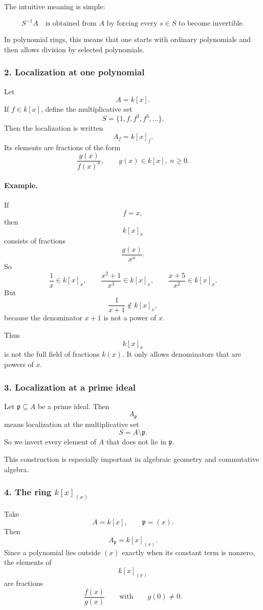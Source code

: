 \documentclass[12pt,a4paper]{article}
\theoremstyle{notespace}
\theoremstyle{definition}
\begin{document}
The intuitive meaning is simple:

\[
S^{-1}A
\quad\text{is obtained from }A\text{ by forcing every }s\in S\text{ to become invertible.}
\]

In polynomial rings, this means that one starts with ordinary polynomials and then allows division by selected polynomials.

\subsubsection{2. Localization at one polynomial}

Let
\[
A=k[x].
\]
If \(f\in k[x]\), define the multiplicative set
\[
S=\{1,f,f^2,f^3,\dots\}.
\]
Then the localization is written
\[
A_f=k[x]_f.
\]
Its elements are fractions of the form
\[
\frac{g(x)}{f(x)^n},
\qquad
g(x)\in k[x],\ n\ge 0.
\]

\paragraph{Example.}
If
\[
f=x,
\]
then
\[
k[x]_x
\]
consists of fractions
\[
\frac{g(x)}{x^n}.
\]
So
\[
\frac{1}{x}\in k[x]_x,
\qquad
\frac{x^2+1}{x^3}\in k[x]_x,
\qquad
\frac{x+5}{x^2}\in k[x]_x.
\]
But
\[
\frac{1}{x+1}\notin k[x]_x,
\]
because the denominator \(x+1\) is not a power of \(x\).

Thus
\[
k[x]_x
\]
is not the full field of fractions \(k(x)\). It only allows denominators that are powers of \(x\).

\subsubsection{3. Localization at a prime ideal}

Let \(\mathfrak p\subseteq A\) be a prime ideal. Then
\[
A_{\mathfrak p}
\]
means localization at the multiplicative set
\[
S=A\setminus \mathfrak p.
\]
So we invert every element of \(A\) that does not lie in \(\mathfrak p\).

This construction is especially important in algebraic geometry and commutative algebra.

\subsubsection{4. The ring \(k[x]_{(x)}\)}

Take
\[
A=k[x],
\qquad
\mathfrak p=(x).
\]
Then
\[
A_{\mathfrak p}=k[x]_{(x)}.
\]
Since a polynomial lies outside \((x)\) exactly when its constant term is nonzero, the elements of
\[
k[x]_{(x)}
\]
are fractions
\[
\frac{f(x)}{g(x)}
\qquad\text{with}\qquad g(0)\neq 0.
\]
\end{document}
